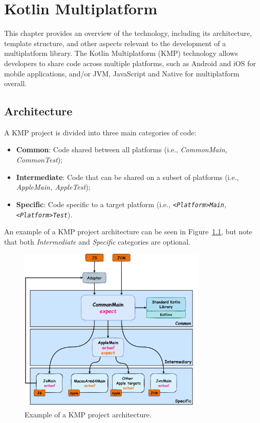 \chapter{Kotlin Multiplatform}\label{ch:kotlin-multiplatform}

This chapter provides an overview of the technology, including its architecture, template structure, and other aspects relevant to the development of a multiplatform library.
The Kotlin Multiplatform (KMP) technology allows developers to share code across multiple platforms, such as Android and iOS for mobile applications, and/or JVM, JavaScript and Native for multiplatform overall.


\section{Architecture}\label{sec:architecture}

A KMP project is divided into three main categories of code:

\begin{itemize}
    \item \textbf{Common}: Code shared between all platforms (i.e., \textit{CommonMain, CommonTest});
    \item \textbf{Intermediate}: Code that can be shared on a subset of platforms (i.e., \textit{AppleMain, AppleTest});
    \item \textbf{Specific}: Code specific to a target platform (i.e., \texttt{\textit{<Platform>Main}}, \texttt{\textit{<Platform>Test}}).
\end{itemize}


An example of a KMP project architecture can be seen in Figure~\ref{fig:kmp-architecture}, but note that both \textit{Intermediate} and \textit{Specific} categories are optional.

\begin{figure}[!htb]
    \centering
    \includegraphics[width=0.8\textwidth]{../figures/02_kmp-architecture}
    \caption{Example of a KMP project architecture.}
    \label{fig:kmp-architecture}
\end{figure}

